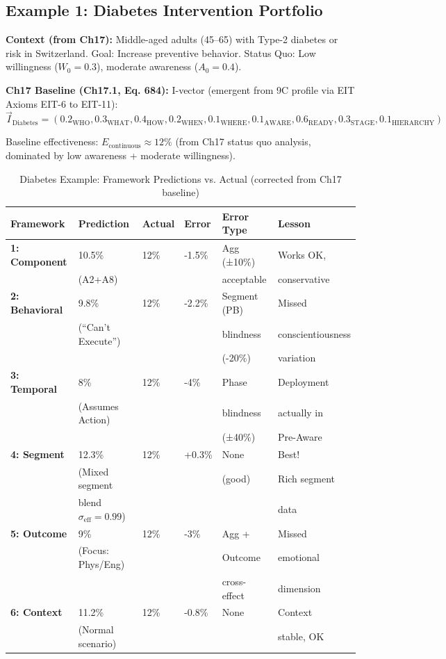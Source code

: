 \subsection{Example 1: Diabetes Intervention Portfolio}
\label{subsec:20-ex-diabetes}

\textbf{Context (from Ch17):} Middle-aged adults (45--65) with Type-2 diabetes or risk in Switzerland. Goal: Increase preventive behavior. Status Quo: Low willingness ($W_0=0.3$), moderate awareness ($A_0=0.4$).

\textbf{Ch17 Baseline (Ch17.1, Eq. 684):} I-vector (emergent from 9C profile via EIT Axioms EIT-6 to EIT-11):
\begin{equation}
\vec{I}_{\text{Diabetes}} = (0.2_{\text{WHO}}, 0.3_{\text{WHAT}}, 0.4_{\text{HOW}}, 0.2_{\text{WHEN}}, 0.1_{\text{WHERE}}, 0.1_{\text{AWARE}}, 0.6_{\text{READY}}, 0.3_{\text{STAGE}}, 0.1_{\text{HIERARCHY}})
\end{equation}

Baseline effectiveness: $E_{\text{continuous}} \approx 12\%$ (from Ch17 status quo analysis, dominated by low awareness + moderate willingness).

\begin{table}[htbp]
\centering
\caption{Diabetes Example: Framework Predictions vs. Actual (corrected from Ch17 baseline)}
\label{tab:20-ex-diabetes-frameworks}
\renewcommand{\arraystretch}{1.4}
\footnotesize
\begin{tabular}{@{}llllll@{}}
\toprule
\textbf{Framework} & \textbf{Prediction} & \textbf{Actual} & \textbf{Error} & \textbf{Error Type} & \textbf{Lesson} \\
\midrule
\textbf{1: Component} & 10.5\% & 12\% & -1.5\% & Agg (±10\%) & Works OK, \\
& (A2+A8) & & & acceptable & conservative \\
\midrule
\textbf{2: Behavioral} & 9.8\% & 12\% & -2.2\% & Segment (PB) & Missed \\
& (``Can't Execute'') & & & blindness & conscientiousness \\
& & & & (-20\%) & variation \\
\midrule
\textbf{3: Temporal} & 8\% & 12\% & -4\% & Phase & Deployment \\
& (Assumes Action) & & & blindness & actually in \\
& & & & (±40\%) & Pre-Aware \\
\midrule
\textbf{4: Segment} & 12.3\% & 12\% & +0.3\% & None & Best! \\
& (Mixed segment & & & (good) & Rich segment \\
& blend $\sigma_{\text{eff}} = 0.99$) & & & & data \\
\midrule
\textbf{5: Outcome} & 9\% & 12\% & -3\% & Agg + & Missed \\
& (Focus: Phys/Eng) & & & Outcome & emotional \\
& & & & cross-effect & dimension \\
\midrule
\textbf{6: Context} & 11.2\% & 12\% & -0.8\% & None & Context \\
& (Normal scenario) & & & & stable, OK \\
\bottomrule
\end{tabular}
\end{table}

